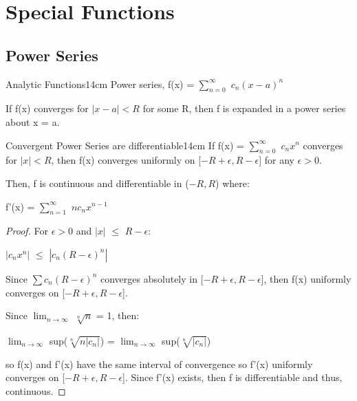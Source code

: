\newpage

\section[Day 15: Special Functions]{ Special Functions }

\subsection{ Power Series }

    \begin{definition}{Analytic Functions}{14cm}
        Power series, f(x) = $\sum_{n=0}^{\infty}$ $c_n(x-a)^n$

        If f(x) converges for $|x-a| < R$
        for some R, then f is expanded in a power series about x = a.
    \end{definition}

    \vspace{0.5cm}



    \begin{wtheorem}{Convergent Power Series are differentiable}{14cm}
        If f(x) = $\sum_{n=0}^{\infty}$ $c_nx^n$ converges for $|x| < R$, then
        f(x) converges uniformly on [$-R+\epsilon,R-\epsilon$] for any
        $\epsilon > 0$.

        Then, f is continuous and differentiable in ($-R,R$) where:

        \hspace{0.5cm}
        f'(x) = $\sum_{n=1}^{\infty}$ $nc_nx^{n-1}$
    \end{wtheorem}

    \begin{proof}
        For $\epsilon > 0$ and $|x|$ $\leq$ $R - \epsilon$:

        \hspace{0.5cm}
        $|c_nx^n|$ $\leq$ $|c_n(R-\epsilon)^n|$

        Since $\sum c_n(R-\epsilon)^n$ converges absolutely in
        [$-R+\epsilon,R-\epsilon$], then f(x) uniformly converges on
        [$-R+\epsilon,R-\epsilon$].
        
        Since $\lim_{n \rightarrow \infty}$ $\sqrt[n]{n}$ = 1, then:

        \hspace{0.5cm}
        $\lim_{n \rightarrow \infty}$ sup($\sqrt[n]{n|c_n|}$)
        = $\lim_{n \rightarrow \infty}$ sup($\sqrt[n]{|c_n|}$)
        
        so f(x) and f'(x) have the same interval of convergence
        so f'(x) uniformly converges on [$-R+\epsilon,R-\epsilon$].
        Since f'(x) exists, then f
        is differentiable and thus, continuous. 
    \end{proof}

